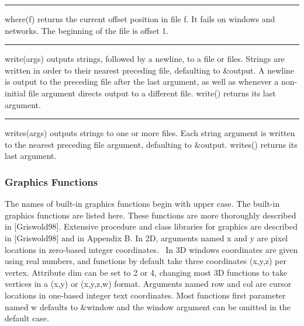 \bigskip\hrule\vspace{0.1cm}

\noindent
{}\textsf{where(f)} returns the
current offset position in file \textsf{f}. It fails on windows and
networks. The beginning of the file is offset 1.

\bigskip\hrule\vspace{0.1cm}

\noindent
\textsf{write(args)} outputs strings, followed by a newline, to a file
or files. Strings are written in order to their nearest preceding file,
defaulting to \textsf{\&output}. A newline is output to the preceding
file after the last argument, as well as whenever a non-initial file
argument directs output to a different file.
\textsf{write()} returns its last argument.

\bigskip\hrule\vspace{0.1cm}

\noindent
\textsf{writes(args)} outputs strings to one or more files. Each string
argument is written to the nearest preceding file argument, defaulting
to \textsf{\&output}. \textsf{writes()} returns its
last argument.

\subsubsection{Graphics Functions}

The names of built-in graphics functions begin with upper case. The
built-in graphics functions are listed here. These functions are more
thoroughly described in [Griswold98]. Extensive procedure and class
libraries for graphics are described in [Griswold98] and in Appendix B.
In 2D, arguments named \textsf{x} and \textsf{y} are pixel locations in
zero-based integer coordinates. \ In 3D windows coordinates are given
using real numbers, and functions by default take three coordinates
(\textsf{x,y,z}) per vertex. Attribute \textsf{dim} can be set to 2 or
4, changing most 3D functions to take vertices in a (\textsf{x,y}) or
(\textsf{x,y,z,w}) format. Arguments named \textsf{row} and
\textsf{col} are cursor locations in one-based integer text
coordinates. Most functions{\textquotesingle} first parameter named
\textsf{w} defaults to \textsf{\&window} and the window argument can be
omitted in the default case.

